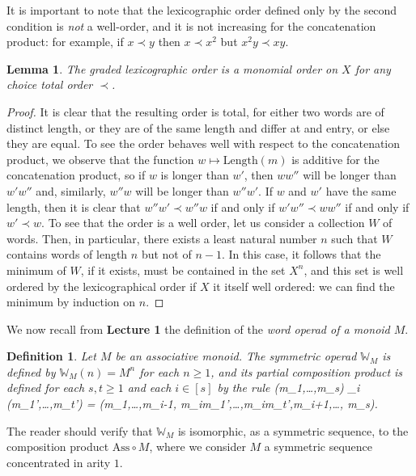 \documentclass[fleqn, a4paper, twoside]{article}
\makeatletter
\newcommand{\0}{\langle 0\rangle}
\let\[\@undefined
\DeclareRobustCommand{\[}{\begin{equation}}%
\let\]\@undefined
\DeclareRobustCommand{\]}{\end{equation}}%
\theoremstyle{mytheorem}
\newtheorem{lemma}[theorem]{Lemma}
\theoremstyle{introthm}
\theoremstyle{mydefinition}
\newtheorem{definition}[theorem]{Definition}
\theoremstyle{mydefinition2}
\theoremstyle{plain} %
\newcommand{\?}{\,?\,}
\theoremstyle{mytheorem}
\theoremstyle{plain} %
\makeatother
\begin{document}
It is important to note that the lexicographic order defined only
by the second condition is \emph{not} a well-order, and it is 
not increasing for the concatenation product: for example,
if $x\prec y$ then $x \prec x^2$ but $x^2y \prec xy$. 

\begin{lemma}
The graded lexicographic order is a monomial order on $X$
for any choice total order $\prec$.
\end{lemma}

\begin{proof}
It is clear that the resulting order is total, for either
two words are of distinct length, or they are of the same length
and differ at and entry, or else they are equal. To see the
order behaves well with respect to the concatenation product,
we observe that the function $w\longmapsto \mathrm{Length}(m)$
is additive for the concatenation product, so if $w$ is longer
than $w'$, then $ww''$ will be longer than $w'w''$ and,
similarly, $w''w$ will be longer than $w''w'$. If $w$ and 
$w'$ have the same length, then it is clear that
$w''w'\prec w''w$ if and only if $w'w''\prec ww''$ if
and only if $w' \prec w$. To see that the order is a well
order, let us consider a collection $W$ of words. Then,
in particular, there exists a least natural number $n$
such that $W$ contains words of length $n$ but not of $n-1$. 
In this case, it follows that the minimum of $W$, if it
exists, must be contained in the set $X^n$, and this
set is well ordered by the lexicographical order if
$X$ it itself well ordered: we can find the minimum 
by induction on $n$.
\end{proof}

We now recall from \textbf{Lecture 1} the definition
of the \emph{word operad of a monoid $M$}.

\begin{definition}
Let $M$ be an associative monoid. The symmetric
operad $\mathbb W_M$ is defined by $\mathbb{W}_M(n) =
M^n$ for each $n\geqslant 1$, and its partial composition
product is defined for each $s,t\geqslant 1$ and each
$i\in [s]$ by the rule
\[(m_1,\ldots,m_s) \circ_i (m_1',\ldots,m_t') = 
 	(m_1,\ldots,m_{i-1}, m_im_1',\ldots,m_im_t',m_{i+1},\ldots, m_s).\] 
\end{definition}

The reader should verify that $\mathbb W_M$ is isomorphic,
as a symmetric sequence, to the composition product $\mathrm{Ass}\circ M$,
where we consider $M$ a symmetric sequence concentrated in arity $1$. 
\end{document}
